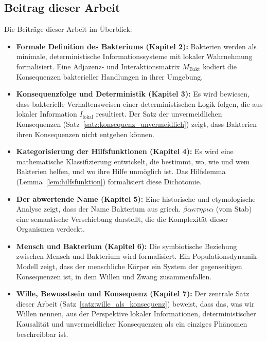\documentclass[a4paper,12pt]{article}
\theoremstyle{definition}
\begin{document}
\subsection{Beitrag dieser Arbeit}

Die Beiträge dieser Arbeit im Überblick:

\begin{itemize}
    \item \textbf{Formale Definition des Bakteriums (Kapitel 2):} Bakterien werden als minimale, deterministische Informationssysteme mit lokaler Wahrnehmung formalisiert. Eine Adjazenz- und Interaktionsmatrix $M_{\text{Bakt}}$ kodiert die Konsequenzen bakterieller Handlungen in ihrer Umgebung.
    
    \item \textbf{Konsequenzfolge und Deterministik (Kapitel 3):} Es wird bewiesen, dass bakterielle Verhaltensweisen einer deterministischen Logik folgen, die aus lokaler Information $I_{\text{lokal}}$ resultiert. Der Satz der unvermeidlichen Konsequenzen (Satz~\ref{satz:konsequenz_unvermeidlich}) zeigt, dass Bakterien ihren Konsequenzen nicht entgehen können.
    
    \item \textbf{Kategorisierung der Hilfsfunktionen (Kapitel 4):} Es wird eine mathematische Klassifizierung entwickelt, die bestimmt, wo, wie und wem Bakterien helfen, und wo ihre Hilfe unmöglich ist. Das Hilfslemma (Lemma~\ref{lem:hilfsfunktion}) formalisiert diese Dichotomie.
    
    \item \textbf{Der abwertende Name (Kapitel 5):} Eine historische und etymologische Analyse zeigt, dass der Name Bakterium aus griech. $\beta\alpha\kappa\tau\eta\rho\iota\alpha$ (vom Stab) eine semantische Verschiebung darstellt, die die Komplexität dieser Organismen verdeckt.
    
    \item \textbf{Mensch und Bakterium (Kapitel 6):} Die symbiotische Beziehung zwischen Mensch und Bakterium wird formalisiert. Ein Populationsdynamik-Modell zeigt, dass der menschliche Körper ein System der gegenseitigen Konsequenzen ist, in dem Willen und Zwang zusammenfallen.
    
    \item \textbf{Wille, Bewusstsein und Konsequenz (Kapitel 7):} Der zentrale Satz dieser Arbeit (Satz~\ref{satz:wille_als_konsequenz}) beweist, dass das, was wir Willen nennen, aus der Perspektive lokaler Informationen, deterministischer Kausalität und unvermeidlicher Konsequenzen als ein einziges Phänomen beschreibbar ist.
\end{itemize}
\end{document}
